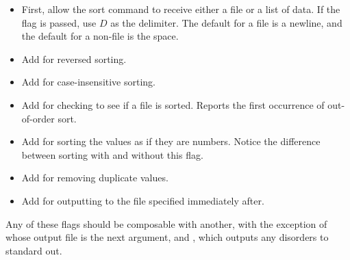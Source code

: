 \begin{itemize}
    \item First, allow the sort command to receive either a file or a list of data. If the  flag is passed, use $D$ as the delimiter. The default for a file is a newline, and the default for a non-file is the space.
    \item Add  for reversed sorting.
    \item Add  for case-insensitive sorting.
    \item Add  for checking to see if a file is sorted. Reports the first occurrence of out-of-order sort.
    \item Add  for sorting the values as if they are numbers. Notice the difference between sorting  with and without this flag.
    \item Add  for removing duplicate values.
    \item Add  for outputting to the file specified immediately after.
\end{itemize}
Any of these flags should be composable with another, with the exception of  whose output file is the next argument, and , which outputs any disorders to standard out.


